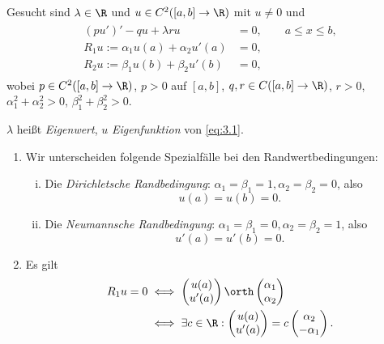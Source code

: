 \begin{df} \label{3.6}
	Gesucht sind $\lambda \in \R$ und $u \in C^2([a,b]\to \R)$ mit $u \neq 0$ und
	\begin{align} \label{eq:3.1}
		\begin{aligned}
		(pu')' - qu + \lambda ru &= 0, \qquad a\le x \le b, \\
		R_1 u := \alpha_1 u(a) + \alpha_2 u'(a) &= 0, \\
		R_2 u := \beta_1 u(b) + \beta_2 u'(b) &= 0,
		\end{aligned}
	\end{align}
	wobei $p \in C^2([a,b] \to \R)$, $p > 0$ auf $[a,b]$, $q,r \in C([a,b] \to \R)$, $r>0$, $\alpha_1^2 + \alpha_2^2 > 0$, $\beta_1^2 + \beta_2^2 > 0$.

	$\lambda$ heißt \emph{Eigenwert}, $u$ \emph{Eigenfunktion} von \eqref{eq:3.1}.
\end{df}

\begin{nt} \label{3.7}
	\begin{enumerate}[1)]
		\item
			Wir unterscheiden folgende Spezialfälle bei den Randwertbedingungen:
			\begin{enumerate}[i)]
				\item
					Die \emph{Dirichletsche Randbedingung}: $\alpha_1 = \beta_1 = 1, \alpha_2 = \beta_2 = 0$, also
					\[
						u(a) = u(b) = 0.
					\]
				\item
					Die \emph{Neumannsche Randbedingung}: $\alpha_1 = \beta_1 = 0, \alpha_2 = \beta_2 = 1$, also
					\[
						u'(a) = u'(b) = 0.
					\]
			\end{enumerate}
		\item
			Es gilt
			\begin{align*}
				R_1 u = 0
				&\iff \begin{pmatrix}
					u(a) \\ u'(a) 
				\end{pmatrix} \orth \begin{pmatrix}
					\alpha_1 \\ \alpha_2
				\end{pmatrix} \\
				&\iff \exists c \in \R : \begin{pmatrix}
					u(a) \\ u'(a)
				\end{pmatrix} = c \begin{pmatrix}
					\alpha_2 \\ -\alpha_1
				\end{pmatrix}.
			\end{align*}


	\end{enumerate}
\end{nt}


